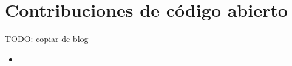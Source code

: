 \chapter{Contribuciones de código abierto}\label{annex:contributions}

TODO: copiar de blog

\begin{itemize}
    \item %

\end{itemize}
